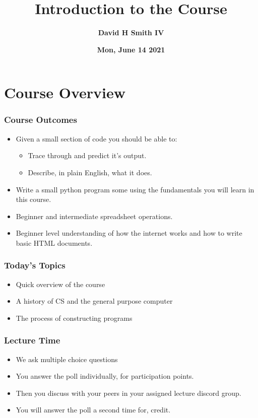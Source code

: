 \documentclass{beamer}
\title{\textbf{Introduction to the Course}}
\author{\textbf{David H Smith IV}}
\institute[\textbf{UIUC}]{\textbf{University of Illinois Urbana-Champaign}}
\date{\textbf{Mon, June 14 2021}}
\begin{document}
\frame{\titlepage}

\section{Course Overview}

%
%
\begin{frame}
  \frametitle{Course Outcomes}
  \begin{itemize}
    \item Given a small section of code you should be able to:
      \begin{itemize}
        \item Trace through and predict it's output.
        \item Describe, in plain English, what it does.
      \end{itemize}
    \item Write a small python program some using the fundamentals you will learn in this course.
    \item Beginner and intermediate spreadsheet operations.
    \item Beginner level understanding of how the internet works and how to write basic HTML documents.
  \end{itemize}
\end{frame}

\begin{frame}
  \frametitle{Today's Topics}
  \begin{itemize}
    \item Quick overview of the course 
    \item A history of CS and the general purpose computer
    \item The process of constructing programs
  \end{itemize}
\end{frame}

\begin{frame}
  \frametitle{Lecture Time}
  \begin{itemize}
    \item We ask multiple choice questions
    \item You answer the poll individually, for participation points.
    \item Then you discuss with your peers in your assigned lecture discord group.
    \item You will answer the poll a second time for, credit.
  \end{itemize}
\end{frame}
\end{document}
